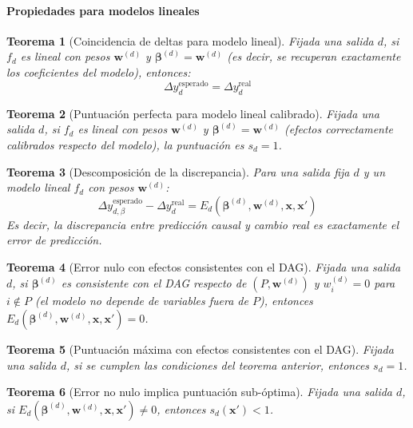 \documentclass[12pt]{report} %
\newtheorem{theorem}{Teorema}
\begin{document}
\paragraph{Propiedades para modelos lineales}

\begin{theorem}[Coincidencia de deltas para modelo lineal]
    Fijada una salida $d$, si $f_d$ es lineal con pesos $\mathbf{w}^{(d)}$ y $\boldsymbol{\beta}^{(d)} = \mathbf{w}^{(d)}$ (es decir, se recuperan exactamente los coeficientes del modelo), entonces:
    $$\Delta y_d^{\text{esperado}} = \Delta y_d^{\text{real}}$$
\end{theorem}

\begin{theorem}[Puntuación perfecta para modelo lineal calibrado]
    Fijada una salida $d$, si $f_d$ es lineal con pesos $\mathbf{w}^{(d)}$ y $\boldsymbol{\beta}^{(d)} = \mathbf{w}^{(d)}$ (efectos correctamente calibrados respecto del modelo), la puntuación es $s_d = 1$.
\end{theorem}

\begin{theorem}[Descomposición de la discrepancia]
    Para una salida fija $d$ y un modelo lineal $f_d$ con pesos $\mathbf{w}^{(d)}$:
    $$\Delta y_{d,\beta}^{\text{esperado}} - \Delta y_d^{\text{real}} = E_d(\boldsymbol{\beta}^{(d)}, \mathbf{w}^{(d)}, \mathbf{x}, \mathbf{x}')$$
    Es decir, la discrepancia entre predicción causal y cambio real es exactamente el error de predicción.
\end{theorem}

\begin{theorem}[Error nulo con efectos consistentes con el DAG]
    Fijada una salida $d$, si $\boldsymbol{\beta}^{(d)}$ es consistente con el DAG respecto de $(P, \mathbf{w}^{(d)})$ y $w_i^{(d)} = 0$ para $i \notin P$ (el modelo no depende de variables fuera de $P$), entonces $E_d(\boldsymbol{\beta}^{(d)}, \mathbf{w}^{(d)}, \mathbf{x}, \mathbf{x}') = 0$.
\end{theorem}

\begin{theorem}[Puntuación máxima con efectos consistentes con el DAG]
    Fijada una salida $d$, si se cumplen las condiciones del teorema anterior, entonces $s_d = 1$.
\end{theorem}

\begin{theorem}[Error no nulo implica puntuación sub-óptima]
    Fijada una salida $d$, si $E_d(\boldsymbol{\beta}^{(d)}, \mathbf{w}^{(d)}, \mathbf{x}, \mathbf{x}') \neq 0$, entonces $s_d(\mathbf{x}') < 1$.
\end{theorem}
\end{document}
